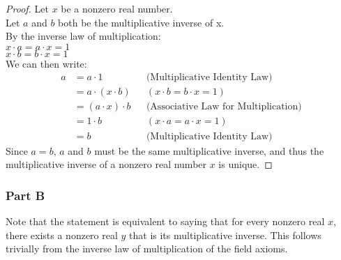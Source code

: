 \documentclass[table]{article}
\begin{document}
\begin{proof}
Let $x$ be a nonzero real number.\\
Let $a$ and $b$ both be the multiplicative inverse of x.\\
By the inverse law of multiplication:\\
$x \cdot a = a \cdot x = 1$\\
$x \cdot b = b \cdot x = 1$\\
We can then write:\\
\begin{align*}
a &= a \cdot 1 && \text{(Multiplicative Identity Law)}\\
&= a \cdot (x \cdot b) && {\text{$(x \cdot b = b \cdot x = 1)$}}\\
&= (a \cdot x) \cdot b && {\text{(Associative Law for Multiplication)}}\\
&= 1 \cdot b && {\text{$(x \cdot a = a \cdot x = 1)$}}\\
&= b && {\text{(Multiplicative Identity Law)}}
\end{align*}
Since $a=b$, $a$ and $b$ must be the same multiplicative inverse, and thus the multiplicative inverse of a nonzero real number $x$ is unique.
\end{proof}
\subsubsection{Part B}
Note that the statement is equivalent to saying that for every nonzero real $x$, there exists a nonzero real $y$ that is its multiplicative inverse. This follows trivially from the inverse law of multiplication of the field axioms.
\end{document}
